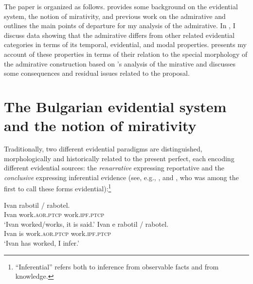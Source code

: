 \documentclass[output=paper]{langscibook}
\begin{document}
The paper is organized as follows.  provides some background on the  evidential system, the notion of mirativity, and previous work on the  admirative and outlines the main points of departure for my analysis of the admirative. In , I discuss data showing that the  admirative differs from other related evidential categories in terms of its temporal, evidential, and modal properties.  presents my account of these properties in terms of their relation to the special morphology of the admirative construction based on \citeauthor{Bustamante2013}'s analysis of the  mirative and  discusses some consequences and residual issues related to the proposal.




\section{The Bulgarian evidential system and the notion of mirativity}\label{sec:BG_evid_syst}

Traditionally, two different evidential paradigms are distinguished, morphologically and historically \citep[see][]{Andrejcin1944,Aronson1967}
related to the present perfect, each encoding different evidential sources: the \textit{renarrative} expressing reportative  and the \textit{conclusive} expressing inferential  evidence (see, e.g., \citealt{Bojadziev.etal1999,Pasov1999,Nicolova2008}, and \citealt{Jacobson1971}, who was among the first to call these forms evidential):\footnote{``Inferential'' refers both to inference from observable facts and from knowledge. %
}

\ea\label{report}
\gll Ivan rabotil / rabotel. \\
Ivan work.\textsc{aor.ptcp} {} work.\textsc{ipf.ptcp} \\
\glt `Ivan worked/works, it is said.'
\ex \label{k:concl}
\gll Ivan e rabotil / rabotel. \\
 Ivan is work.\textsc{aor.ptcp} {} work.\textsc{ipf.ptcp}\\
\glt `Ivan has worked, I infer.'
\z
\end{document}
